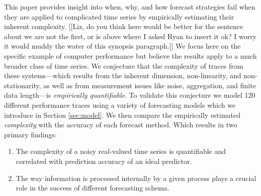 







This paper provides insight into when, why, and how forecast strategies fail when they are applied to complicated time series by empirically estimating their inherent complexity. [[Liz, do you think here would be better for the sentence about we are not the first, or is above where I asked Ryan to insert it ok? I worry it would muddy the water of this synopsis paragraph.]] We focus here on the specific example of
computer performance but believe the results apply to a much broader class of time series. We conjecture that the complexity of traces
from these systems---which results from the inherent dimension,
non-linearity, and non-stationarity, as well as from
measurement issues like noise, aggregation, and finite data
length---is \emph{empirically quantifiable}. To validate this conjecture we model 120 different performance traces using a variety of forecasting models which we introduce in Section \ref{sec:model}. We then compare the empirically estimated \emph{complexity} with the accuracy of each forecast method. Which results in two primary findings:


\begin{enumerate}

\item The complexity of a noisy real-valued time series is quantifiable and correlated with prediction accuracy of an ideal predictor.

\item The way information is processed internally by a given process plays a crucial role in the success of different forecasting schema.

\end{enumerate}


